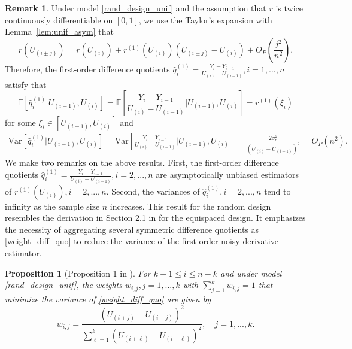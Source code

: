\documentclass{uwstat572}
\newtheorem{prop}[theorem]{Proposition}
\theoremstyle{definition}
\newtheorem{Remark}{Remark}
\renewcommand{\hat}{\widehat}
\theoremstyle{theorem}
\begin{document}
\begin{Remark}
\label{remark:O_n}
Under model \eqref{rand_design_unif} and the assumption that $r$ is twice continuously differentiable on $[0,1]$, we use the Taylor's expansion with Lemma~\ref{lem:unif_asym} that
$$r(U_{(i\pm j)}) = r(U_{(i)}) + r^{(1)}(U_{(i)}) \left(U_{(i\pm j)} - U_{(i)}\right) + O_P\left(\frac{j^2}{n^2}\right).$$
Therefore, the first-order difference quotients $\hat{q}_i^{(1)} = \frac{Y_i - Y_{i-1}}{U_{(i)}- U_{(i-1)}}, i=1,...,n$ satisfy that
$$\mathbb{E}\left[\hat{q}_i^{(1)} \big| U_{(i-1)}, U_{(i)}\right] = \mathbb{E}\left[\frac{Y_i - Y_{i-1}}{U_{(i)}- U_{(i-1)}} \Big| U_{(i-1)}, U_{(i)}\right] = r^{(1)}(\xi_i)$$
for some $\xi_i \in \left[U_{(i-1)}, U_{(i)}\right]$ and
\begin{align*}
\mathrm{Var}\left[\hat{q}_i^{(1)} \big| U_{(i-1)}, U_{(i)}\right] = \mathrm{Var}\left[\frac{Y_i - Y_{i-1}}{U_{(i)}- U_{(i-1)}} \Big| U_{(i-1)}, U_{(i)}\right] = \frac{2\sigma_e^2}{\left(U_{(i)} - U_{(i-1)}\right)^2} = O_P\left(n^2\right).
\end{align*}
We make two remarks on the above results. First, the first-order difference quotients $\hat{q}_i^{(1)} = \frac{Y_i - Y_{i-1}}{U_{(i)}- U_{(i-1)}}, i=2,...,n$ are asymptotically unbiased estimators of $r^{(1)}(U_{(i)}),i=2,...,n$. Second, the variances of $\hat{q}_i^{(1)}, i=2,...,n$ tend to infinity as the sample size $n$ increases. This result for the random design resembles the derivation in Section 2.1 in \cite{de2013derivative} for the equispaced design. It emphasizes the necessity of aggregating several symmetric difference quotients as \eqref{weight_diff_quo} to reduce the variance of the first-order noisy derivative estimator.\\
\end{Remark}

\begin{prop}[Proposition 1 in \citealt{liu2020smoothed}]
\label{prop:weight_first}
For $k+1\leq i\leq n-k$ and under model \eqref{rand_design_unif}, the weights $w_{i,j},j=1,...,k$ with $\sum_{j=1}^k w_{i,j}=1$ that minimize the variance of \eqref{weight_diff_quo} are given by 
$$w_{i,j} = \frac{\left(U_{(i+j)} - U_{(i-j)}\right)^2}{\sum_{\ell=1}^k \left(U_{(i+\ell)} - U_{(i-\ell)}\right)^2}, \quad j=1,...,k.$$
\end{prop}
\end{document}
